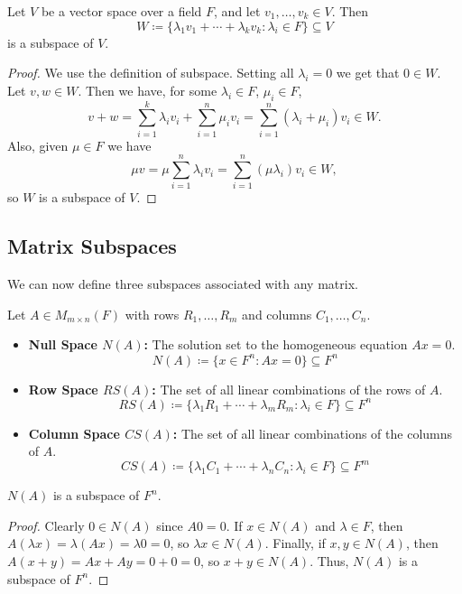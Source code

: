\documentclass[../linear_algebra_and_groups.tex]{subfiles}
\begin{document}
\begin{proposition}
\label{prop:spansubspace}
    \begin{shaded*}
        Let $V$ be a vector space over a field $F$, and let $v_1,\dots,v_k\in V$. Then \[W\coloneqq \{\lambda_1v_1+\cdots+\lambda_kv_k:\lambda_i\in F\}\subseteq V\] is a subspace of $V$.
    \end{shaded*}
\end{proposition}
\begin{proof}
    We use the definition of subspace. Setting all $\lambda_i=0$ we get that $0\in W$. Let $v,w\in W$. Then we have, for some $\lambda_i\in F$, $\mu_i\in F$, \[v+w=\sum_{i=1}^k\lambda_iv_i+\sum_{i=1}^n\mu_iv_i=\sum_{i=1}^n(\lambda_i+\mu_i)v_i\in W.\]Also, given $\mu\in F$ we have \[\mu v= \mu\sum_{i=1}^n\lambda_iv_i=\sum_{i=1}^n(\mu\lambda_i)v_i\in W, \]so $W$ is a subspace of $V$.
\end{proof}

\subsection{Matrix Subspaces}

We can now define three subspaces associated with any matrix.

\begin{definition}
    \begin{shaded*}
        Let $A \in M_{m\times n}(F)$ with rows $R_1, \dots, R_m$ and columns $C_1, \dots, C_n$.
        \begin{itemize}
            \item \textbf{Null Space $N(A)$:} The solution set to the homogeneous equation $Ax=0$.
            \[ N(A) \coloneqq \{x \in F^n : Ax = 0\} \subseteq F^n \]
            \item \textbf{Row Space $RS(A)$:} The set of all linear combinations of the rows of $A$.
            \[ RS(A) \coloneqq \{\lambda_1R_1+\cdots+\lambda_m R_m : \lambda_i\in F\} \subseteq F^n \]
            \item \textbf{Column Space $CS(A)$:} The set of all linear combinations of the columns of $A$.
            \[ CS(A) \coloneqq \{\lambda_1C_1+\cdots+\lambda_n C_n : \lambda_i\in F\} \subseteq F^m \]
        \end{itemize}
    \end{shaded*}
\end{definition}

\begin{proposition}
    \begin{shaded*}
        $N(A)$ is a subspace of $F^n$.
    \end{shaded*}
\end{proposition}
\begin{proof}
    Clearly $0\in N(A)$ since $A0=0$. 
    If $x\in N(A)$ and $\lambda\in F$, then $A(\lambda x)=\lambda(Ax)=\lambda 0=0$, so $\lambda x \in N(A)$. 
    Finally, if $x,y\in N(A)$, then $A(x+y)=Ax+Ay=0+0=0$, so $x+y \in N(A)$. 
    Thus, $N(A)$ is a subspace of $F^n$.
    \qedhere
\end{proof}
\end{document}
